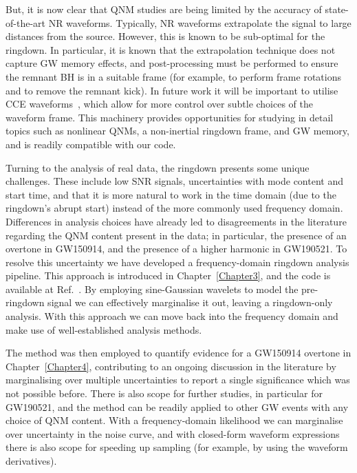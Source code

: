 \documentclass[
12pt, %
english, %
doublespacing, %
headsepline, %
]{MastersDoctoralThesis} %
\begin{document}
But, it is now clear that QNM studies are being limited by the accuracy of state-of-the-art NR waveforms. 
Typically, NR waveforms extrapolate the signal to large distances from the source.
However, this is known to be sub-optimal for the ringdown.
In particular, it is known that the extrapolation technique does not capture GW memory effects, and post-processing must be performed to ensure the remnant BH is in a suitable frame (for example, to perform frame rotations and to remove the remnant kick). 
In future work it will be important to utilise CCE waveforms~\cite{MaganaZertuche:2021syq}, which allow for more control over subtle choices of the waveform frame.
This machinery provides opportunities for studying in detail topics such as nonlinear QNMs, a non-inertial ringdown frame, and GW memory, and is readily compatible with our code.

Turning to the analysis of real data, the ringdown presents some unique challenges. 
These include low SNR signals, uncertainties with mode content and start time, and that it is more natural to work in the time domain (due to the ringdown's abrupt start) instead of the more commonly used frequency domain.
Differences in analysis choices have already led to disagreements in the literature regarding the QNM content present in the data; in particular, the presence of an overtone in GW150914, and the presence of a higher harmonic in GW190521. 
To resolve this uncertainty we have developed a frequency-domain ringdown analysis pipeline.
This approach is introduced in Chapter~\ref{Chapter3}, and the code is available at Ref.~\cite{fdringdown}.
By employing sine-Gaussian wavelets to model the pre-ringdown signal we can effectively marginalise it out, leaving a ringdown-only analysis. 
With this approach we can move back into the frequency domain and make use of well-established analysis methods.

The method was then employed to quantify evidence for a GW150914 overtone in Chapter~\ref{Chapter4}, contributing to an ongoing discussion in the literature by marginalising over multiple uncertainties to report a single significance which was not possible before.
There is also scope for further studies, in particular for GW190521, and the method can be readily applied to other GW events with any choice of QNM content. 
With a frequency-domain likelihood we can marginalise over uncertainty in the noise curve, and with closed-form waveform expressions there is also scope for speeding up sampling (for example, by using the waveform derivatives).
\end{document}
